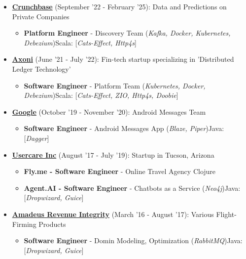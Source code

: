\documentclass{article}
\begin{document}
\begin{itemize}
\item \href{https://crunchbase.com}{\textbf{Crunchbase}} {(September '22 - February '25)}: Data and Predictions on Private Companies 
\begin{itemize}
\item \textbf{Platform Engineer} - Discovery Team (\textit{Kafka, Docker, Kubernetes, Debezium})\newline Scala: [\textit{Cats-Effect, Http4s}]
\end{itemize}
\item \href{https://axoni.com}{\textbf{Axoni}} {(June '21 - July '22)}: Fin-tech startup specializing in 'Distributed Ledger Technology' 
\begin{itemize}
\item \textbf{Software Engineer} - Platform Team (\textit{Kubernetes, Docker, Debezium})\newline Scala: [\textit{Cats-Effect, ZIO, Http4s, Doobie}]
\end{itemize}
\item \href{https://google.com}{\textbf{Google}} {(October '19 - November '20)}: Android Messages Team 
\begin{itemize}
\item \textbf{Software Engineer} - Android Messages App (\textit{Blaze, Piper})\newline Java: [\textit{Dagger}]
\end{itemize}
\item \href{https://www.crunchbase.com/organization/usercare}{\textbf{Usercare Inc}} {(August '17 - July '19)}: Startup in Tucson, Arizona 
\begin{itemize}
\item \textbf{Fly.me - Software Engineer} - Online Travel Agency \newline Clojure
\item \textbf{Agent.AI - Software Engineer} - Chatbots as a Service (\textit{Neo4j})\newline Java: [\textit{Dropwizard, Guice}]
\end{itemize}
\item \href{https://amadeus.com/en/portfolio/airlines/revenue-integrity}{\textbf{Amadeus Revenue Integrity}} {(March '16 - August '17)}: Various Flight-Firming Products 
\begin{itemize}
\item \textbf{Software Engineer} - Domin Modeling, Optimization (\textit{RabbitMQ})\newline Java: [\textit{Dropwizard, Guice}]

\end{itemize}
\end{itemize}
\end{document}
